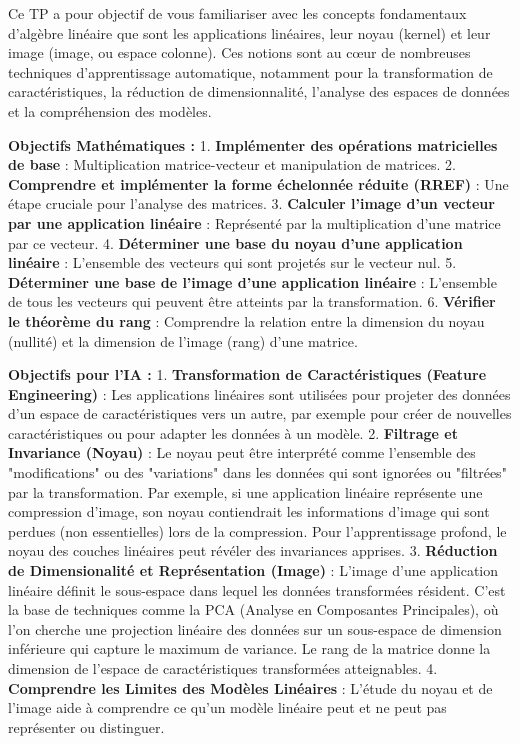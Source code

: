 \documentclass{report}
\begin{document}
Ce TP a pour objectif de vous familiariser avec les concepts fondamentaux d'algèbre linéaire que sont les applications linéaires, leur noyau (kernel) et leur image (image, ou espace colonne). Ces notions sont au cœur de nombreuses techniques d'apprentissage automatique, notamment pour la transformation de caractéristiques, la réduction de dimensionnalité, l'analyse des espaces de données et la compréhension des modèles.

\textbf{Objectifs Mathématiques :}
1.  \textbf{Implémenter des opérations matricielles de base} : Multiplication matrice-vecteur et manipulation de matrices.
2.  \textbf{Comprendre et implémenter la forme échelonnée réduite (RREF)} : Une étape cruciale pour l'analyse des matrices.
3.  \textbf{Calculer l'image d'un vecteur par une application linéaire} : Représenté par la multiplication d'une matrice par ce vecteur.
4.  \textbf{Déterminer une base du noyau d'une application linéaire} : L'ensemble des vecteurs qui sont projetés sur le vecteur nul.
5.  \textbf{Déterminer une base de l'image d'une application linéaire} : L'ensemble de tous les vecteurs qui peuvent être atteints par la transformation.
6.  \textbf{Vérifier le théorème du rang} : Comprendre la relation entre la dimension du noyau (nullité) et la dimension de l'image (rang) d'une matrice.

\textbf{Objectifs pour l'IA :}
1.  \textbf{Transformation de Caractéristiques (Feature Engineering)} : Les applications linéaires sont utilisées pour projeter des données d'un espace de caractéristiques vers un autre, par exemple pour créer de nouvelles caractéristiques ou pour adapter les données à un modèle.
2.  \textbf{Filtrage et Invariance (Noyau)} : Le noyau peut être interprété comme l'ensemble des "modifications" ou des "variations" dans les données qui sont ignorées ou "filtrées" par la transformation. Par exemple, si une application linéaire représente une compression d'image, son noyau contiendrait les informations d'image qui sont perdues (non essentielles) lors de la compression. Pour l'apprentissage profond, le noyau des couches linéaires peut révéler des invariances apprises.
3.  \textbf{Réduction de Dimensionalité et Représentation (Image)} : L'image d'une application linéaire définit le sous-espace dans lequel les données transformées résident. C'est la base de techniques comme la PCA (Analyse en Composantes Principales), où l'on cherche une projection linéaire des données sur un sous-espace de dimension inférieure qui capture le maximum de variance. Le rang de la matrice donne la dimension de l'espace de caractéristiques transformées atteignables.
4.  \textbf{Comprendre les Limites des Modèles Linéaires} : L'étude du noyau et de l'image aide à comprendre ce qu'un modèle linéaire peut et ne peut pas représenter ou distinguer.
\end{document}
